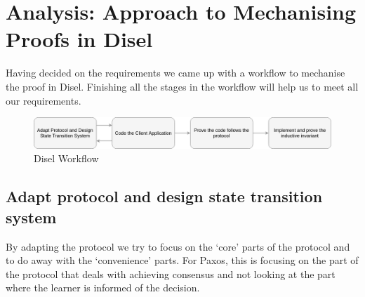 \vspace{-5mm}
\section{Analysis: Approach to Mechanising Proofs in Disel}
Having decided on the requirements we came up with a workflow to
mechanise the proof in Disel. Finishing all the stages in the workflow
will help us to meet all our requirements.

\begin{figure}
\centering
\includegraphics[width=\textwidth]{figures/disel_workflow.png}
\caption{Disel Workflow
\label{fig:myInlineFigure}}
\end{figure}

%
%
%
%
%
%
%
%
%

\subsection{Adapt protocol and design state transition system}
By adapting the protocol we try to focus on the `core' parts of the protocol
and to do away with the `convenience' parts. For Paxos, this is focusing on the
part of the protocol that deals with achieving consensus and not looking at the
part where the learner is informed of the decision.

